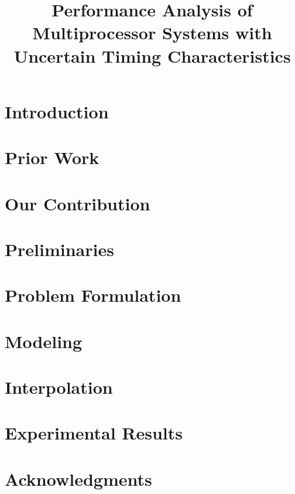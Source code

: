 \documentclass[journal]{IEEEtran}
\title{
  Performance Analysis of Multiprocessor Systems
  with Uncertain Timing Characteristics
}
\author{}
\begin{document}
  \maketitle

  \begin{abstract}
    
  \end{abstract}


  \section{Introduction}
  

  \section{Prior Work}
  

  \section{Our Contribution}
  

  \section{Preliminaries}
  

  \section{Problem Formulation} 
  

  \section{Modeling}
  

  \section{Interpolation}
  

  \section{Experimental Results}
  

  \section*{Acknowledgments}
  

  \begingroup
    
    
  \endgroup
\end{document}
